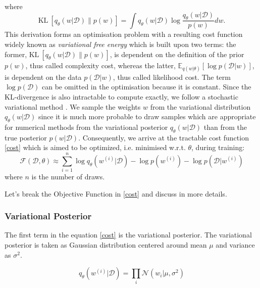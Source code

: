where
\begin{equation}
    \text{KL} \ [q_{\theta}(w|\mathcal{D})\|p(w)]= \int q_{\theta}(w|\mathcal{D})\log\frac{q_{\theta}(w|\mathcal{D})}{p(w)}dw .
\end{equation}
This derivation forms an optimisation problem with a resulting cost function widely known as \textit{variational free energy} \cite{neal1998view,yedidia2005constructing,friston2007variational} which is built upon two terms: the former, $\text{KL} \ [q_{\theta}(w|\mathcal{D})\|p(w)]$, is dependent on the definition of the prior $p(w)$, thus called complexity cost, whereas the latter, $\mathbb{E}_{q(w|\theta)}[\log p(\mathcal{D}|w)]$, is dependent on the data $p(\mathcal{D}|w)$, thus called likelihood cost. 
The term $\log p(\mathcal{D})$ can be omitted in the optimisation because it is constant.
\newline Since the KL-divergence is also intractable to compute exactly, we follow a stochastic variational method \cite{graves2011practical,blundell2015weight}.
We sample the weights $w$ from the variational distribution $q_{\theta}(w|\mathcal{D})$ since it is much more probable to draw samples which are appropriate for numerical methods from the variational posterior $q_{\theta}(w|\mathcal{D})$ than from the true posterior $p(w|\mathcal{D})$. Consequently, we arrive at the tractable cost function \eqref{cost} which is aimed to be optimized, i.e. minimised w.r.t. $\theta$, during training:
\begin{equation} \label{cost}
    \mathcal{F}(\mathcal{D}, \theta)\approx \sum_{i=1}^n \log q_{\theta}(w^{(i)}|\mathcal{D})-\log p(w^{(i)})-\log p(\mathcal{D}|w^{(i)})
\end{equation}
%
where $n$ is the number of draws.

Let's break the Objective Function in \eqref{cost} and discuss in more details. 
\subsubsection{Variational Posterior }

The first term in the equation \eqref{cost} is the variational posterior. The variational posterior is taken as Gaussian distribution centered around mean $\mu$ and variance as $\sigma^2$. 

\begin{equation}
    q_{\theta}(w^{(i)}|\mathcal{D})= \prod_{i} \mathcal{N}(w_{i} | \mu,\sigma^2)
\end{equation}

